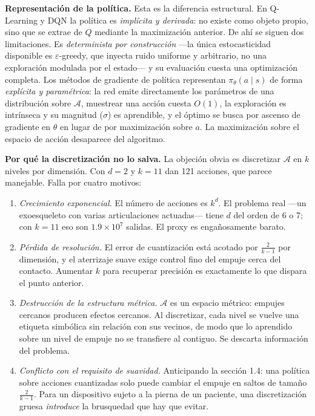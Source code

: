 \documentclass[11pt,letterpaper]{article}
\newcommand{\lead}[1]{\textbf{#1}}
\begin{document}
\begin{respuesta}
\medskip
\lead{Representación de la política.} Esta es la diferencia estructural. En Q-Learning y
DQN la política es \emph{implícita y derivada}: no existe como objeto propio, sino que se
extrae de $Q$ mediante la maximización anterior. De ahí se siguen dos limitaciones. Es
\emph{determinista por construcción} —la única estocasticidad disponible es
$\varepsilon$-greedy, que inyecta ruido uniforme y arbitrario, no una exploración
modulada por el estado— y su evaluación cuesta una optimización completa. Los métodos de
gradiente de política representan $\pi_\theta(a\mid s)$ de forma \emph{explícita y
paramétrica}: la red emite directamente los parámetros de una distribución sobre
$\mathcal{A}$, muestrear una acción cuesta $O(1)$, la exploración es intrínseca y su
magnitud ($\sigma$) es aprendible, y el óptimo se busca por ascenso de gradiente en
$\theta$ en lugar de por maximización sobre $a$. La maximización sobre el espacio de
acción desaparece del algoritmo.

\medskip
\lead{Por qué la discretización no lo salva.} La objeción obvia es discretizar
$\mathcal{A}$ en $k$ niveles por dimensión. Con $d=2$ y $k=11$ dan 121 acciones, que
parece manejable. Falla por cuatro motivos:

\begin{enumerate}[leftmargin=1.4em,itemsep=2pt]
  \item \emph{Crecimiento exponencial.} El número de acciones es $k^d$. El problema real
        —un exoesqueleto con varias articulaciones actuadas— tiene $d$ del orden de 6 o
        7; con $k=11$ eso son $1.9\times 10^7$ salidas. El proxy es engañosamente barato.
  \item \emph{Pérdida de resolución.} El error de cuantización está acotado por
        $\tfrac{2}{k-1}$ por dimensión, y el aterrizaje suave exige control fino del
        empuje cerca del contacto. Aumentar $k$ para recuperar precisión es exactamente
        lo que dispara el punto anterior.
  \item \emph{Destrucción de la estructura métrica.} $\mathcal{A}$ es un espacio métrico:
        empujes cercanos producen efectos cercanos. Al discretizar, cada nivel se vuelve
        una etiqueta simbólica sin relación con sus vecinos, de modo que lo aprendido
        sobre un nivel de empuje no se transfiere al contiguo. Se descarta información
        del problema.
  \item \emph{Conflicto con el requisito de suavidad.} Anticipando la sección 1.4: una
        política sobre acciones cuantizadas solo puede cambiar el empuje en saltos de
        tamaño $\tfrac{2}{k-1}$. Para un dispositivo sujeto a la pierna de un paciente,
        una discretización gruesa \emph{introduce} la brusquedad que hay que evitar.
\end{enumerate}
\end{respuesta}
\end{document}
